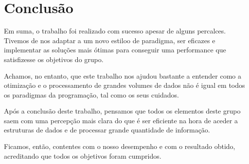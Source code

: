 \documentclass{article}
\begin{document}
\clearpage

\section{Conclusão}
\par Em suma, o trabalho foi realizado com sucesso apesar de alguns percalces. Tivemos de nos adaptar a um novo estiloo de paradigma, ser eficazes e implementar as soluções mais ótimas para conseguir uma performance que satisfizesse os objetivos do grupo.
\par Achamos, no entanto, que este trabalho nos ajudou bastante a entender como a otimização e o processamento de grandes volumes de dados não é igual em todos os paradigmas da programação, tal como os seus cuidados.
\par Após a conclusão deste trabalho, pensamos que todos os elementos deste grupo saem com uma percepção mais clara do que é ser eficiente na hora de aceder a estruturas de dados e de processar grande quantidade de informação.
\par Ficamos, então, contentes com o nosso desempenho e com o resultado obtido, acreditando que todos os objetivos foram cumpridos.
\end{document}
